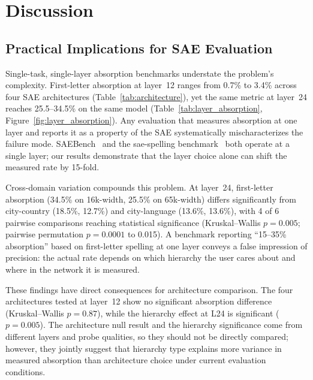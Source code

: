 \documentclass{article}
\begin{document}
\section{Discussion}
\label{sec:discussion}

\subsection{Practical Implications for SAE Evaluation}
\label{sec:practical}

Single-task, single-layer absorption benchmarks understate the problem's complexity. First-letter absorption at layer~12 ranges from 0.7\% to 3.4\% across four SAE architectures (Table~\ref{tab:architecture}), yet the same metric at layer~24 reaches 25.5--34.5\% on the same model (Table~\ref{tab:layer_absorption}, Figure~\ref{fig:layer_absorption}). Any evaluation that measures absorption at one layer and reports it as a property of the SAE systematically mischaracterizes the failure mode. SAEBench~\citep{karvonen2025saebench} and the sae-spelling benchmark~\citep{chanin2024absorption} both operate at a single layer; our results demonstrate that the layer choice alone can shift the measured rate by 15-fold.

Cross-domain variation compounds this problem. At layer~24, first-letter absorption (34.5\% on 16k-width, 25.5\% on 65k-width) differs significantly from city-country (18.5\%, 12.7\%) and city-language (13.6\%, 13.6\%), with 4 of 6 pairwise comparisons reaching statistical significance (Kruskal--Wallis $p = 0.005$; pairwise permutation $p = 0.0001$ to 0.015). A benchmark reporting ``15--35\% absorption'' based on first-letter spelling at one layer conveys a false impression of precision: the actual rate depends on which hierarchy the user cares about and where in the network it is measured.

These findings have direct consequences for architecture comparison. The four architectures tested at layer~12 show no significant absorption difference (Kruskal--Wallis $p = 0.87$), while the hierarchy effect at L24 is significant ($p = 0.005$). The architecture null result and the hierarchy significance come from different layers and probe qualities, so they should not be directly compared; however, they jointly suggest that hierarchy type explains more variance in measured absorption than architecture choice under current evaluation conditions.
\end{document}
